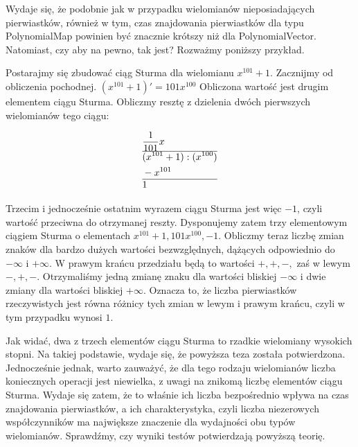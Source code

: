Wydaje się, że podobnie jak w przypadku wielomianów nieposiadających pierwiastków, również w tym, czas znajdowania pierwiastków dla typu PolynomialMap powinien być znacznie krótszy niż dla PolynomialVector. Natomiast, czy aby na pewno, tak jest? Rozważmy poniższy przykład.

Postarajmy się zbudować ciąg Sturma dla wielomianu $x^{101}+1$. Zacznijmy od obliczenia pochodnej.
$(x^{101}+1)'=101x^{100}$
Obliczona wartość jest drugim elementem ciągu Sturma. Obliczmy resztę z dzielenia dwóch pierwszych wielomianów tego ciągu:

\begin{equation*}
\begin{split}
&\frac{1}{101}x \\
\hline
&(x^{101}+1) : (x^{100}) \\
&-x^{101} \\
\hline
&1
\end{split}
\end{equation*}

Trzecim i jednocześnie ostatnim wyrazem ciągu Sturma jest więc $-1$, czyli wartość przeciwna do otrzymanej reszty. Dysponujemy zatem trzy elementowym ciągiem Sturma o elementach ${x^{101}+1, 101x^{100}, -1}$. Obliczmy teraz liczbę zmian znaków dla bardzo dużych wartości bezwzględnych, dążących odpowiednio do $-\infty$ i $+\infty$. W prawym krańcu przedziału będą to wartości $+,+,-,$ zaś w lewym $-,+,-.$ Otrzymaliśmy jedną zmianę znaku dla wartości bliskiej $-\infty$ i dwie zmiany dla wartości bliskiej $+\infty$. Oznacza to, że liczba pierwiastków rzeczywistych jest równa różnicy tych zmian w lewym i prawym krańcu, czyli w tym przypadku wynosi $1$.

Jak widać, dwa z trzech elementów ciągu Sturma to rzadkie wielomiany wysokich stopni. Na takiej podstawie, wydaje się, że powyższa teza została potwierdzona. Jednocześnie jednak, warto zauważyć, że dla tego rodzaju wielomianów liczba koniecznych operacji jest niewielka, z uwagi na znikomą liczbę elementów ciągu Sturma. Wydaje się zatem, że to właśnie ich liczba bezpośrednio wpływa na czas znajdowania pierwiastków, a ich charakterystyka, czyli liczba niezerowych współczynników ma największe znaczenie dla wydajności obu typów wielomianów. Sprawdźmy, czy wyniki testów potwierdzają powyższą teorię.


